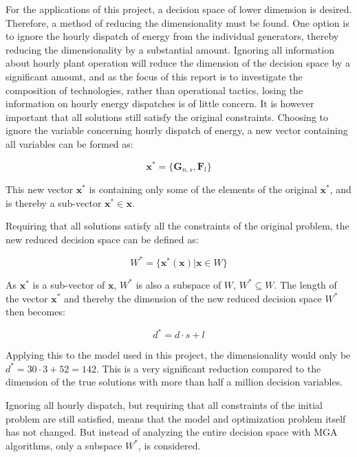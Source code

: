 For the applications of this project, a decision space of lower dimension is desired. Therefore, a method of reducing the dimensionality must be found. One option is to ignore the hourly dispatch of energy from the individual generators, thereby reducing the dimensionality by a substantial amount. 
Ignoring all information about hourly plant operation will reduce the dimension of the decision space by a significant amount, and as the focus of this report is to investigate the composition of technologies, rather than operational tactics, losing the information on hourly energy dispatches is of little concern. It is however important that all solutions still satisfy the original constraints. 
Choosing to ignore the variable concerning hourly dispatch of energy, a new vector containing all variables can be formed as: 

\begin{equation}\label{eq:Optimization_variables_2}
\mathbf{x}^* = \{  \mathbf{G}_{n,s} , \mathbf{F}_{l} \}
\end{equation}

This new vector $\mathbf{x}^*$ is containing only some of the elements of the original $\mathbf{x}^*$, and is thereby a sub-vector $\mathbf{x}^*\in\mathbf{x}$. 

Requiring that all solutions satisfy all the constraints of the original problem, the new reduced decision space can be defined as:

\begin{equation}
W^* = \{ \mathbf{x}^*(\mathbf{x}) | \mathbf{x} \in W \}
\end{equation}

As $\mathbf{x}^*$ is a sub-vector of $\mathbf{x}$, $W^*$ is also a subspace of $W$, $W^*\subseteq W$. The length of the vector $\mathbf{x}^*$ and thereby the dimension of the new reduced decision space $W^*$ then becomes:

\begin{equation}
d^* = d\cdot s + l
\end{equation}

Applying this to the model used in this project, the dimensionality would only be $d^* = 30\cdot 3 + 52 = 142$. This is a very significant reduction compared to the dimension of the true solutions with more than half a million decision variables.

Ignoring all hourly dispatch, but requiring that all constraints of the initial problem are still satisfied, means that the model and optimization problem itself has not changed. But instead of analyzing the entire decision space with MGA algorithms, only a subspace $W^*$, is considered. 

